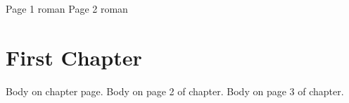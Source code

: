 \documentclass[12pt]{report}
\begin{document}
\pagestyle{plain}
Page 1 roman
\clearpage
Page 2 roman
\clearpage

\pagestyle{fancy}
\chapter{First Chapter}
Body on chapter page.
\clearpage
Body on page 2 of chapter.
\clearpage
Body on page 3 of chapter.
\end{document}
